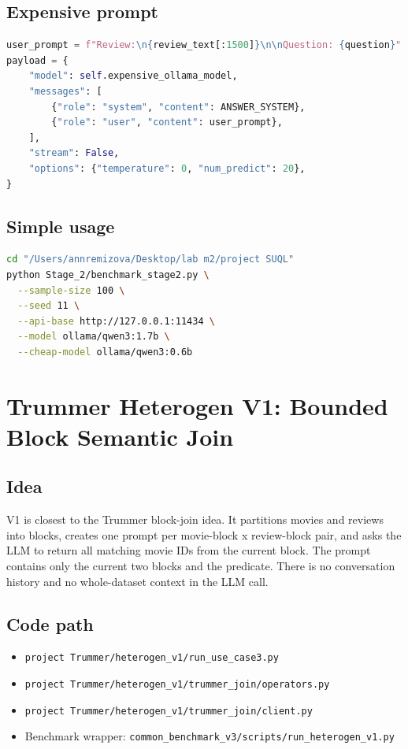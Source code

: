 \documentclass[11pt,oneside]{book}
\begin{document}
\section{Expensive prompt}
\begin{lstlisting}[language=Python]
user_prompt = f"Review:\n{review_text[:1500]}\n\nQuestion: {question}"
payload = {
    "model": self.expensive_ollama_model,
    "messages": [
        {"role": "system", "content": ANSWER_SYSTEM},
        {"role": "user", "content": user_prompt},
    ],
    "stream": False,
    "options": {"temperature": 0, "num_predict": 20},
}
\end{lstlisting}
\section{Simple usage}
\begin{lstlisting}[language=bash]
cd "/Users/annremizova/Desktop/lab m2/project SUQL"
python Stage_2/benchmark_stage2.py \
  --sample-size 100 \
  --seed 11 \
  --api-base http://127.0.0.1:11434 \
  --model ollama/qwen3:1.7b \
  --cheap-model ollama/qwen3:0.6b
\end{lstlisting}
\chapter{Trummer Heterogen V1: Bounded Block Semantic Join}
\section{Idea}
V1 is closest to the Trummer block-join idea. It partitions movies and reviews into blocks, creates one prompt per movie-block x review-block pair, and asks the LLM to return all matching movie IDs from the current block. The prompt contains only the current two blocks and the predicate. There is no conversation history and no whole-dataset context in the LLM call.
\section{Code path}
\begin{itemize}
\item \texttt{project Trummer/heterogen\_v1/run\_use\_case3.py}
\item \texttt{project Trummer/heterogen\_v1/trummer\_join/operators.py}
\item \texttt{project Trummer/heterogen\_v1/trummer\_join/client.py}
\item Benchmark wrapper: \texttt{common\_benchmark\_v3/scripts/run\_heterogen\_v1.py}
\end{itemize}
\end{document}
